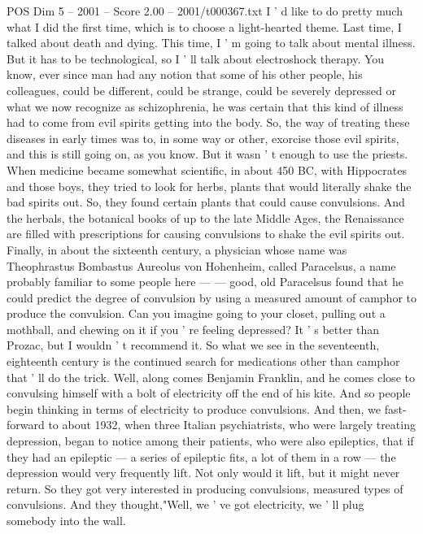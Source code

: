 \begin{textsample}{POS Dim 5 – 2001 – Score 2.00 – 2001/t000367.txt}  \label{ex:f5_pos_050}
I ' d like to do pretty much what I did the first time, which is to choose a light-hearted theme.
Last time, I talked about death and dying.
This time, I ' m going to talk about mental illness.
But it has to be technological, so I ' ll talk about electroshock therapy.
You know, ever since man had any notion that some of his other people, his colleagues, could be different, could be strange, could be severely depressed or what we now recognize as schizophrenia, he was certain that this kind of illness had to come from evil spirits getting into the body.
So, the way of treating these diseases in early times was to, in some way or other, exorcise those evil spirits, and this is still going on, as you know.
But it wasn ' t enough to use the priests.
When medicine became somewhat scientific, in about 450 BC, with Hippocrates and those boys, they tried to look for herbs, plants that would literally shake the bad spirits out.
So, they found certain plants that could cause convulsions.
And the herbals, the botanical books of up to the late Middle Ages, the Renaissance are filled with prescriptions for causing convulsions to shake the evil spirits out.
Finally, in about the sixteenth century, a physician whose name was Theophrastus Bombastus Aureolus von Hohenheim, called Paracelsus, a name probably familiar to some people here — — good, old Paracelsus found that he could predict the degree of convulsion by using a measured amount of camphor to produce the convulsion.
Can you imagine going to your closet, pulling out a mothball, and chewing on it if you ' re feeling depressed?
It ' s better than Prozac, but I wouldn ' t recommend it.
So what we see in the seventeenth, eighteenth century is the continued search for medications other than camphor that ' ll do the trick.
Well, along comes Benjamin Franklin, and he comes close to convulsing himself with a bolt of electricity off the end of his kite.
And so people begin thinking in terms of electricity to produce convulsions.
And then, we fast-forward to about 1932, when three Italian psychiatrists, who were largely treating depression, began to notice among their patients, who were also epileptics, that if they had an epileptic — a series of epileptic fits, a lot of them in a row — the depression would very frequently lift.
Not only would it lift, but it might never return.
So they got very interested in producing convulsions, measured types of convulsions.
And they thought,"Well, we ' ve got electricity, we ' ll plug somebody into the wall.

\end{textsample}
